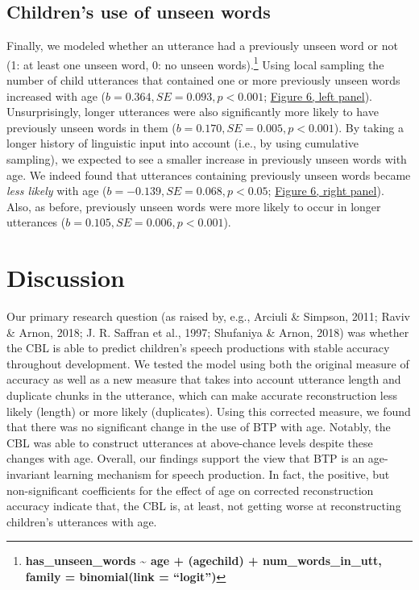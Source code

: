 \documentclass[man,mask,floatsintext]{apa6}
\let\rmarkdownfootnote\footnote%
\def\footnote{\protect\rmarkdownfootnote}
\begin{document}
\subsection{Children's use of unseen
words}\label{childrens-use-of-unseen-words}

Finally, we modeled whether an utterance had a previously unseen word or
not (1: at least one unseen word, 0: no unseen words).\footnote{\textbf{has\_unseen\_words
  \textasciitilde{} age + (age\textbar{}child) + num\_words\_in\_utt,
  family = binomial(link = \enquote{logit})}} Using local sampling the
number of child utterances that contained one or more previously unseen
words increased with age (\(b = 0.364, SE = 0.093, p < 0.001\);
\protect\hyperlink{fig6}{Figure 6, left panel}). Unsurprisingly, longer
utterances were also significantly more likely to have previously unseen
words in them (\(b = 0.170, SE = 0.005, p < 0.001\)). By taking a longer
history of linguistic input into account (i.e., by using cumulative
sampling), we expected to see a smaller increase in previously unseen
words with age. We indeed found that utterances containing previously
unseen words became \emph{less likely} with age
(\(b = -0.139, SE = 0.068, p < 0.05\); \protect\hyperlink{fig6}{Figure
6, right panel}). Also, as before, previously unseen words were more
likely to occur in longer utterances
(\(b = 0.105, SE = 0.006, p < 0.001\)).

\section{Discussion}\label{discussion}

Our primary research question (as raised by, e.g., Arciuli \& Simpson,
2011; Raviv \& Arnon, 2018; J. R. Saffran et al., 1997; Shufaniya \&
Arnon, 2018) was whether the CBL is able to predict children's speech
productions with stable accuracy throughout development. We tested the
model using both the original measure of accuracy as well as a new
measure that takes into account utterance length and duplicate chunks in
the utterance, which can make accurate reconstruction less likely
(length) or more likely (duplicates). Using this corrected measure, we
found that there was no significant change in the use of BTP with age.
Notably, the CBL was able to construct utterances at above-chance levels
despite these changes with age. Overall, our findings support the view
that BTP is an age-invariant learning mechanism for speech production.
In fact, the positive, but non-significant coefficients for the effect
of age on corrected reconstruction accuracy indicate that, the CBL is,
at least, not getting worse at reconstructing children's utterances with
age.
\end{document}
